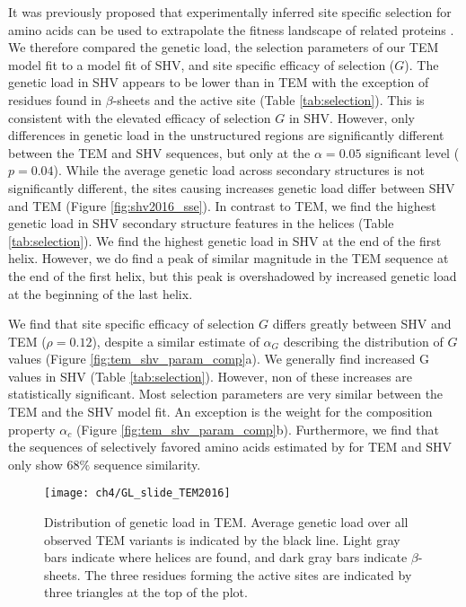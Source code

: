 It was previously proposed that experimentally inferred site specific selection for amino acids can be used to extrapolate the fitness landscape of related proteins \citep{bloom2014, bloom2017}.
We therefore compared the genetic load, the \selac selection parameters of our \selac TEM model fit to a \selac model fit of SHV, and site specific efficacy of selection ($G$).
The genetic load in SHV appears to be lower than in TEM with the exception of residues found in $\beta$-sheets and the active site (Table \ref{tab:selection}).
This is consistent with the elevated efficacy of selection $G$ in SHV.
However, only differences in genetic load in the unstructured regions are significantly different between the TEM and SHV sequences, but only at the $\alpha = 0.05$ significant level ($p = 0.04$).
While the average genetic load across secondary structures is not significantly different, the sites causing increases genetic load differ between SHV and TEM (Figure \ref{fig:shv2016_sse}).
In contrast to TEM, we find the highest genetic load in SHV secondary structure features in the helices (Table \ref{tab:selection}).
We find the highest genetic load in SHV at the end of the first helix.
However, we do find a peak of similar magnitude in the TEM sequence at the end of the first helix, but this peak is overshadowed by increased genetic load at the beginning of the last helix.

We find that site specific efficacy of selection $G$ differs greatly between SHV and TEM ($\rho = 0.12$), despite a similar estimate of $\alpha_G$ describing the distribution of $G$ values (Figure \ref{fig:tem_shv_param_comp}a).
We generally find increased G values in SHV (Table \ref{tab:selection}).
However, non of these increases are statistically significant.
Most \selac selection parameters are very similar between the TEM and the SHV model fit. 
An exception is the weight for the \PC composition property $\alpha_c$ (Figure \ref{fig:tem_shv_param_comp}b).
Furthermore, we find that the sequences of selectively favored amino acids estimated by \selac for TEM and SHV only show $68 \%$ sequence similarity.



\begin{figure}[H]
     \centering
	\texttt{[image: ch4/GL\_slide\_TEM2016]}
	\caption{Distribution of genetic load in TEM. 
	Average genetic load over all observed TEM variants is indicated by the black line. 
	Light gray bars indicate where helices are found, and dark gray bars indicate $\beta$-sheets.
	The three residues forming the active sites are indicated by three triangles at the top of the plot.}
	\label{fig:tem2016_sse}
\end{figure}

